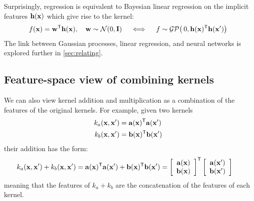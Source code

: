Surprisingly, \gp{} regression is equivalent to Bayesian linear regression on the implicit features ${\bf{h}}({\bf{x}})$ which give rise to the kernel:
%
\begin{align}
f({\bf{x}}) = {\bf{w}}^{\mathsf{T}} {\bf{h}}({\bf{x}}), \quad {\bf{w}} \sim \mathcal{N}\!\left(0,\mathbf{I}\right) \quad
\iff
\quad f \sim \mathcal{GP}\!\left(\, 0, {\bf{h}}({\bf{x}}) ^{\mathsf{T}} {\bf{h}}({\bf{x}}') \right)
\end{align}
%
The link between Gaussian processes, linear regression, and neural networks is explored further in \cref{sec:relating}.


\subsection{Feature-space view of combining kernels}

\def\feata{\va}
\def\featb{\vb}



We can also view kernel addition and multiplication as a combination of the features of the original kernels.
For example, given two kernels
%
\begin{align}
k_a(\iva, \iva') & = \feata(\iva)\tra \feata(\iva')\\
k_b(\iva, \iva') & = \featb(\iva)\tra \featb(\iva')
\end{align}
%
their addition has the form:
%
\begin{align}
k_a(\iva, \iva') + k_b(\iva, \iva')
& = \feata(\iva)\tra \feata(\iva') + \featb(\iva)\tra \featb(\iva') 
 = \colvec{\feata(\iva)}{\featb(\iva)}\tra \colvec{\feata(\iva')}{\featb(\iva')}
\end{align}
%
meaning that the features of $k_a + k_b$ are the concatenation of the features of each kernel.

